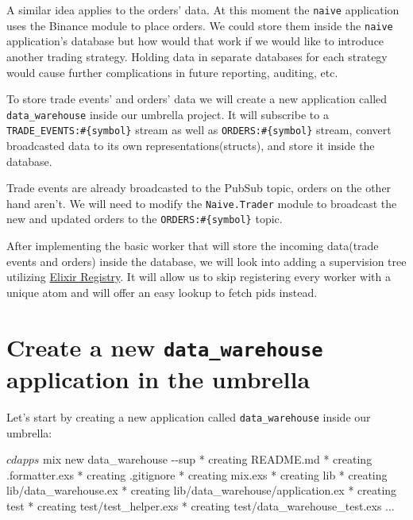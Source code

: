 \documentclass[
]{book}
\newenvironment{Shaded}{\begin{snugshade}}{\end{snugshade}}
\newcommand{\AttributeTok}[1]{\textcolor[rgb]{0.77,0.63,0.00}{#1}}
\newcommand{\ExtensionTok}[1]{#1}
\newcommand{\NormalTok}[1]{#1}
\begin{document}
A similar idea applies to the orders' data. At this moment the \texttt{naive} application uses the Binance module to place orders. We could store them inside the \texttt{naive} application's database but how would that work if we would like to introduce another trading strategy. Holding data in separate databases for each strategy would cause further complications in future reporting, auditing, etc.

To store trade events' and orders' data we will create a new application called \texttt{data\_warehouse} inside our umbrella project. It will subscribe to a \texttt{TRADE\_EVENTS:\#\{symbol\}} stream as well as \texttt{ORDERS:\#\{symbol\}} stream, convert broadcasted data to its own representations(structs), and store it inside the database.

Trade events are already broadcasted to the PubSub topic, orders on the other hand aren't. We will need to modify the \texttt{Naive.Trader} module to broadcast the new and updated orders to the \texttt{ORDERS:\#\{symbol\}} topic.

After implementing the basic worker that will store the incoming data(trade events and orders) inside the database, we will look into adding a supervision tree utilizing \href{https://hexdocs.pm/elixir/master/Registry.html}{Elixir Registry}. It will allow us to skip registering every worker with a unique atom and will offer an easy lookup to fetch pids instead.

\hypertarget{create-a-new-data_warehouse-application-in-the-umbrella}{%
\section{\texorpdfstring{Create a new \texttt{data\_warehouse} application in the umbrella}{Create a new data\_warehouse application in the umbrella}}\label{create-a-new-data_warehouse-application-in-the-umbrella}}

Let's start by creating a new application called \texttt{data\_warehouse} inside our umbrella:

\begin{Shaded}
\begin{Highlighting}[]
\ExtensionTok{$}\NormalTok{ cd apps}
\ExtensionTok{$}\NormalTok{ mix new data\_warehouse }\AttributeTok{{-}{-}sup}
\ExtensionTok{*}\NormalTok{ creating README.md}
\ExtensionTok{*}\NormalTok{ creating .formatter.exs}
\ExtensionTok{*}\NormalTok{ creating .gitignore}
\ExtensionTok{*}\NormalTok{ creating mix.exs}
\ExtensionTok{*}\NormalTok{ creating lib}
\ExtensionTok{*}\NormalTok{ creating lib/data\_warehouse.ex}
\ExtensionTok{*}\NormalTok{ creating lib/data\_warehouse/application.ex}
\ExtensionTok{*}\NormalTok{ creating test}
\ExtensionTok{*}\NormalTok{ creating test/test\_helper.exs}
\ExtensionTok{*}\NormalTok{ creating test/data\_warehouse\_test.exs}
\ExtensionTok{...}
\end{Highlighting}
\end{Shaded}
\end{document}
